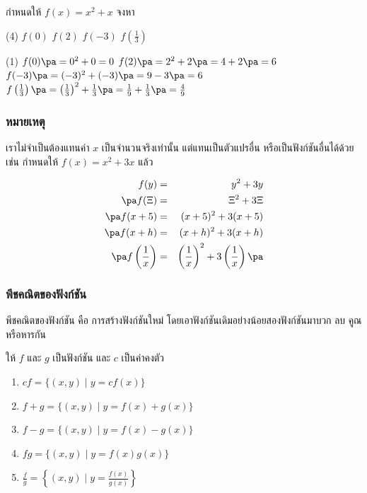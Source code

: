\begin{frame}[t]
\begin{ex}
กำหนดให้ $f(x) = x^2+x$ จงหา
\begin{tasks}(4)
\task $f(0)$
\task $f(2)$
\task $f(-3)$ 
\task $f\left(\frac{1}{3}\right)$
\end{tasks}
\end{ex}
\begin{sol}
\begin{tasks}(1)
\task $f(0) \pa = 0^2 + 0 = 0$ \pa
\task $f(2) \pa = 2^2 + 2 \pa= 4+2 \pa= 6$ \pa
\task $f(-3) \pa = (-3)^2 + (-3) \pa = 9 - 3 \pa = 6$ \pa
\task $f\left(\frac{1}{3}\right) \pa= \left(\frac{1}{3}\right)^2 + \frac{1}{3} \pa= \frac{1}{9} + \frac{1}{3} \pa= \frac{4}{9}$
\end{tasks}
\end{sol}
\end{frame}

\begin{frame}[t]
\frametitle{หมายเหตุ}
\begin{remark}{}
เราไม่จำเป็นต้องแทนค่า $x$ เป็นจำนวนจริงเท่านั้น แต่แทนเป็นตัวแปรอื่น หรือเป็นฟังก์ชันอื่นได้ด้วย
\pa
เช่น กำหนดให้ $f(x) = x^2+3x$ แล้ว
\begin{slide}
\begin{eqnarray*}
f(y) &=& y^2+3y \\ \pa
f(\Xi) &=& \Xi^2 + 3\Xi \\ \pa
f(x+5) &=& (x+5)^2 + 3(x+5) \\ \pa
f(x+h) &=& (x+h)^2 + 3(x+h) \\ \pa
f\left(\frac{1}{x}\right) &=& \left(\frac{1}{x}\right)^2 + 3\left(\frac{1}{x}\right) \pa
\end{eqnarray*}
\end{slide}
\end{remark}
\end{frame}

\begin{frame}
\frametitle{พีชคณิตของฟังก์ชัน}
พีชคณิตของฟังก์ชัน คือ การสร้างฟังก์ชันใหม่ โดยเอาฟังก์ชันเดิมอย่างน้อยสองฟังก์ชันมาบวก ลบ คูณ หรือหารกัน
\pa
\begin{prop}{}{}
ให้ $f$ และ $g$ เป็นฟังก์ชัน และ $c$ เป็นค่าคงตัว
\begin{enumerate}
\item $cf = \{(x,y) \mid y = cf(x)\}$ \pa
\item $f+g = \{(x,y) \mid y = f(x) + g(x) \}$ \pa
\item $f-g = \{(x,y) \mid y = f(x) - g(x) \}$ \pa
\item $fg = \{(x,y) \mid y = f(x)  g(x) \}$ \pa
\item $ \frac{f}{g} = \left\{(x,y) \mid y = \frac{f(x)}{g(x)} \right\}$ 
\end{enumerate}
\end{prop}
\end{frame}


